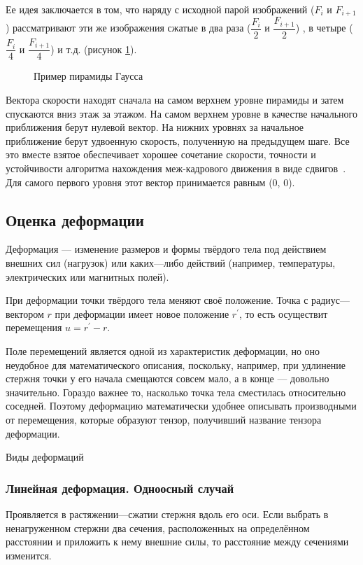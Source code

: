 Ее идея заключается в том, что наряду с исходной парой изображений ($F_i$ и $F_{i+1}$) рассматривают эти же изображения сжатые в два раза ($\dfrac{F_i}{2}$ и $\dfrac{F_{i+1}}{2}$) , в четыре ($\dfrac{F_i}{4}$ и $\dfrac{F_{i+1}}{4}$) и т.д. (рисунок \ref{pic:pyramid}).
\begin{figure}[ht]
\caption{Пример пирамиды Гаусса}
\label{pic:pyramid}
\end{figure}

Вектора скорости находят сначала на самом верхнем уровне пирамиды и затем спускаются вниз этаж за этажом. На самом верхнем уровне в качестве начального приближения берут нулевой вектор. На нижних уровнях за начальное приближение берут удвоенную скорость, полученную на предыдущем шаге. Все это вместе взятое обеспечивает хорошее сочетание скорости, точности и устойчивости алгоритма нахождения меж-кадрового движения в виде сдвигов~\cite{Bouguet2000}. Для самого первого уровня этот вектор принимается равным (0, 0).

\subsection{Оценка деформации}
Деформация — изменение размеров и формы твёрдого тела под действием внешних сил (нагрузок) или каких—либо действий (например, температуры, электрических или магнитных полей).

При деформации точки твёрдого тела меняют своё положение. Точка с радиус—вектором $r$ при деформации имеет новое положение $r^{'}$, то есть осуществит перемещения $u = r^{'} - r$. 

Поле перемещений является одной из характеристик деформации, но оно неудобное для математического описания, поскольку, например, при удлинение стержня точки у его начала смещаются совсем мало, а в конце — довольно значительно. Гораздо важнее то, насколько точка тела сместилась относительно соседней. Поэтому деформацию математически удобнее описывать производными от перемещения, которые образуют тензор, получивший название тензора деформации.

Виды деформаций
\subsubsection{Линейная деформация. Одноосный случай}

Проявляется в растяжении—сжатии стержня вдоль его оси. Если выбрать в ненагруженном стержни два сечения, расположенных на определённом расстоянии и приложить к нему внешние силы, то расстояние между сечениями изменится.

